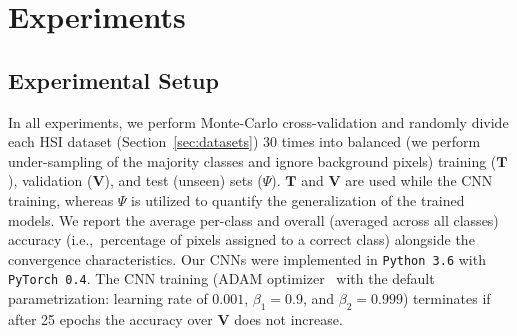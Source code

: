 \documentclass[journal]{IEEEtran}
\newcommand{\TrainingSet}{\bm{T}} %
\newcommand{\ValidationSet}{\bm{V}} %
\newcommand{\TestSet}{\Psi}
\begin{document}

\section{Experiments}\label{sec:experiments}


\subsection{Experimental Setup}

In all experiments, we perform Monte-Carlo cross-validation and randomly divide each HSI dataset (Section~\ref{sec:datasets}) 30 times into balanced (we perform under-sampling of the majority classes and ignore background pixels) training ($\TrainingSet$), validation ($\ValidationSet$), and test (unseen) sets ($\TestSet$). $\TrainingSet$ and $\ValidationSet$ are used while the CNN training, whereas $\TestSet$ is utilized to quantify the generalization of the trained models. We report the average per-class and overall (averaged across all classes) accuracy (i.e.,~percentage of pixels assigned to a correct class) alongside the convergence characteristics. Our CNNs were implemented in \texttt{Python 3.6} with \texttt{PyTorch 0.4}. The CNN training (ADAM optimizer~\cite{DBLP:journals/corr/KingmaB14} with the default parametrization: learning rate of $0.001$, $\beta_1 = 0.9$, and $\beta_2 = 0.999$) terminates if after 25 epochs the accuracy over $\ValidationSet$ does not increase.
\end{document}

